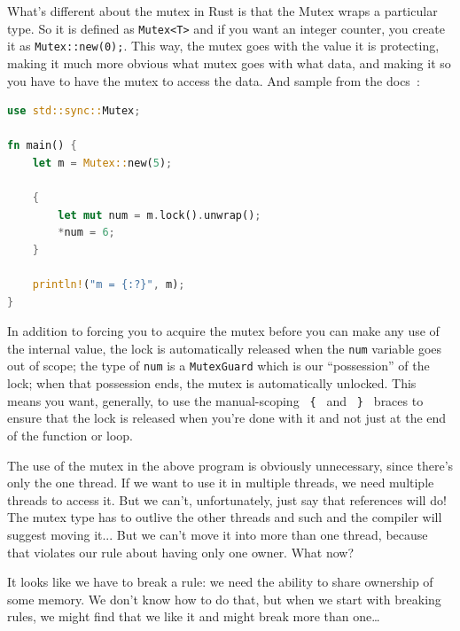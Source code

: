 What's different about the mutex in Rust is that the Mutex wraps a particular type. So it is defined as \texttt{Mutex<T>} and if you want an integer counter, you create it as \texttt{Mutex::new(0);}. This way, the mutex goes with the value it is protecting, making it much more obvious what mutex goes with what data, and making it so you have to have the mutex to access the data. And sample from the docs~\cite{rustdocs}:

\begin{lstlisting}[language=Rust]
use std::sync::Mutex;

fn main() {
    let m = Mutex::new(5);

    {
        let mut num = m.lock().unwrap();
        *num = 6;
    }

    println!("m = {:?}", m);
}
\end{lstlisting}

In addition to forcing you to acquire the mutex before you can make any use of the internal value, the lock is automatically released when the \texttt{num} variable goes out of scope; the type of \texttt{num} is a \texttt{MutexGuard} which is our ``possession'' of the lock; when that possession ends, the mutex is automatically unlocked. This means you want, generally, to use the manual-scoping \texttt{ \{ } and \texttt{ \} } braces to ensure that the lock is released when you're done with it and not just at the end of the function or loop.

The use of the mutex in the above program is obviously unnecessary, since there's only the one thread. If we want to use it in multiple threads, we need multiple threads to access it. But we can't, unfortunately, just say that references will do! The mutex type has to outlive the other threads and such and the compiler will suggest moving it... But we can't move it into more than one thread, because that violates our rule about having only one owner. What now?

It looks like we have to break a rule: we need the ability to share ownership of some memory. We don't know how to do that, but when we start with breaking rules, we might find that we like it and might break more than one\ldots





